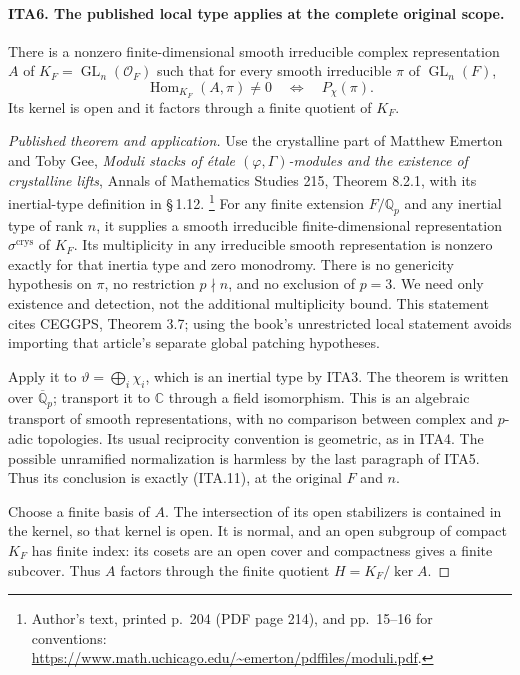 \paragraph{ITA6. The published local type applies at the complete original scope.}
\label{claim:ITA6}
There is a nonzero finite-dimensional smooth irreducible complex
representation $A$ of $K_F=\operatorname{GL}_n(\mathcal O_F)$
such that for every smooth irreducible $\pi$ of
$\operatorname{GL}_n(F)$,
\[
             \operatorname{Hom}_{K_F}(A,\pi)\ne0
                         \quad\Longleftrightarrow\quad P_\chi(\pi).
                                                               \tag{ITA.11}
\]
Its kernel is open and it factors through a finite quotient of
$K_F$.
\begin{proof}[Published theorem and application]
Use the crystalline part of Matthew Emerton and Toby Gee,
\emph{Moduli stacks of \textup{\'etale} $(\varphi,\Gamma)$-modules
and the existence of crystalline lifts}, Annals of Mathematics
Studies 215, Theorem 8.2.1, with its inertial-type definition
in \S\,1.12.
\footnote{Author's text, printed p.~204 (PDF page 214),
and pp.~15--16 for conventions:
\url{https://www.math.uchicago.edu/~emerton/pdffiles/moduli.pdf}.}
For any finite extension $F/\mathbb Q_p$ and any inertial
type of rank $n$, it supplies a smooth irreducible
finite-dimensional representation $\sigma^{\mathrm{crys}}$
of $K_F$.  Its multiplicity in any irreducible smooth
representation is nonzero exactly for that inertia type
and zero monodromy.  There is no genericity hypothesis on
$\pi$, no restriction $p\nmid n$, and no exclusion of
$p=3$.  We need only existence and detection, not the
additional multiplicity bound.  This statement cites
CEGGPS, Theorem 3.7; using the book's unrestricted local
statement avoids importing that article's separate
global patching hypotheses.

Apply it to $\vartheta=\bigoplus_i\chi_i$, which is an
inertial type by ITA3.  The theorem is written over
$\overline{\mathbb Q}_p$; transport it to $\mathbb C$
through a field isomorphism.  This is an algebraic
transport of smooth representations, with no comparison
between complex and $p$-adic topologies.  Its usual
reciprocity convention is geometric, as in ITA4.
The possible unramified normalization is harmless by the
last paragraph of ITA5.  Thus its conclusion is exactly
(ITA.11), at the original $F$ and $n$.

Choose a finite basis of $A$.  The intersection of its
open stabilizers is contained in the kernel, so that
kernel is open.  It is normal, and an open subgroup
of compact $K_F$ has finite index: its cosets are an
open cover and compactness gives a finite subcover.
Thus $A$ factors through the finite quotient
$H=K_F/\ker A$.
\end{proof}

